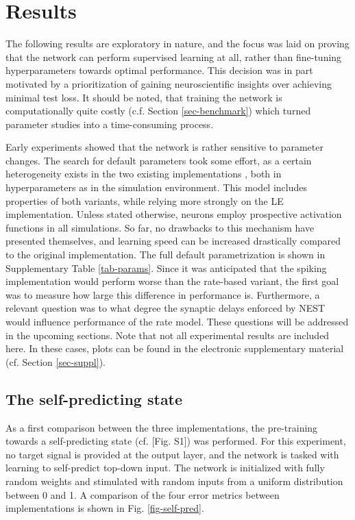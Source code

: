 
\chapter{Results}

The following results are exploratory in nature, and the focus was laid on proving that the network can perform
supervised learning at all, rather than fine-tuning hyperparameters towards optimal performance. This decision was in
part motivated by a prioritization of gaining neuroscientific insights over achieving minimal test loss. It should be
noted, that training the network is computationally quite costly (c.f. Section \ref{sec-benchmark}) which turned
parameter studies into a time-consuming process.

Early experiments showed that the network is rather sensitive to parameter changes. The search for default parameters
took some effort, as a certain heterogeneity exists in the two existing implementations
\citep{sacramento2018dendritic,Haider2021}, both in hyperparameters as in the simulation environment. This model
includes properties of both variants, while relying more strongly on the LE implementation. Unless stated otherwise,
neurons employ prospective activation functions in all simulations. So far, no drawbacks to this mechanism have
presented themselves, and learning speed can be increased drastically compared to the original implementation. The full
default parametrization is shown in Supplementary Table \ref{tab-params}. Since it was anticipated that the spiking
implementation would perform worse than the rate-based variant, the first goal was to measure how large this difference
in performance is. Furthermore, a relevant question was to what degree the synaptic delays enforced by NEST would
influence performance of the rate model. These questions will be addressed in the upcoming sections. Note that not all
experimental results are included here. In these cases, plots can be found in the electronic supplementary material (cf.
Section \ref{sec-suppl}).


\section{The self-predicting state}

As a first comparison between the three implementations, the pre-training towards a self-predicting state (cf.
\citep{sacramento2018dendritic}[Fig. S1]) was performed. For this experiment, no target signal is provided at the output
layer, and the network is tasked with learning to self-predict top-down input. The network is initialized with fully
random weights and stimulated with random inputs from a uniform distribution between 0 and 1. A comparison of the four
error metrics between implementations is shown in Fig. \ref{fig-self-pred}.




